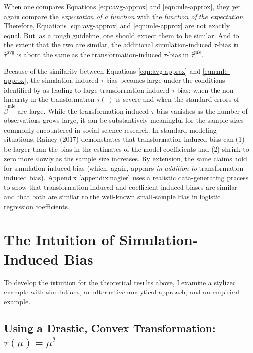 \documentclass[12pt]{article}
\begin{document}
When one compares Equations \ref{eqn:avg-approx} and \ref{eqn:mle-approx}, they yet again compare the \textit{expectation of a function} with the \textit{function of the expectation}.
Therefore, Equations \ref{eqn:avg-approx} and \ref{eqn:mle-approx} are not exactly equal.
But, as a rough guideline, one should expect them to be similar.
And to the extent that the two are similar, the additional simulation-induced $\tau$-bias in $\hat{\tau}^\text{avg}$ is about the same as the transformation-induced $\tau$-bias in $\hat{\tau}^\text{mle}$. 

Because of the similarity between Equations \ref{eqn:avg-approx} and \ref{eqn:mle-approx}, the simulation-induced $\tau$-bias becomes large under the conditions identified by \cite{Rainey2017} as leading to large transformation-induced $\tau$-bias: when the non-linearity in the transformation $\tau(\cdot)$ is severe and when the standard errors of $\hat{\beta}^\text{mle}$ are large.
While the transformation-induced $\tau$-bias vanishes as the number of observations grows large, it can be substantively meaningful for the sample sizes commonly encountered in social science research. 
In standard modeling situations, Rainey (2017) demonstrates that transformation-induced bias can (1) be larger than the bias in the estimates of the model coefficients and (2) shrink to zero more slowly as the sample size increases. 
By extension, the same claims hold for simulation-induced bias (which, again, appears \textit{in addition to} transformation-induced bias). 
Appendix \ref{appendix:nagler} uses a realistic data-generating process to show that transformation-induced and coefficient-induced biases are similar and that both are similar to the well-known small-sample bias in logistic regression coefficients.

\section*{The Intuition of Simulation-Induced Bias}

To develop the intuition for the theoretical results above, I examine a stylized example with simulations, an alternative analytical approach, and an empirical example.

\subsection*{Using a Drastic, Convex Transformation: $\tau(\mu) = \mu^2$}
\end{document}
